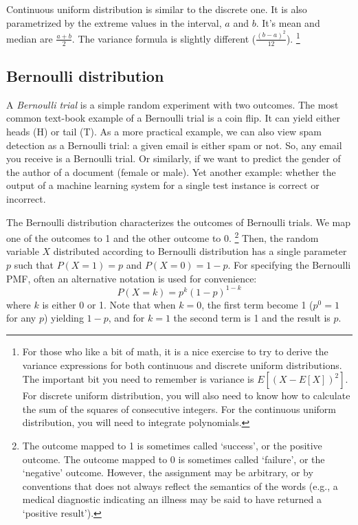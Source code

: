 Continuous uniform distribution is similar to the discrete one.
It is also parametrized by the extreme values in the interval,
$a$ and $b$.
It's mean and median are $\frac{a+b}{2}$.
The variance formula is slightly different ($\frac{(b-a)^{2}}{12}$).%
\footnote{%
  For those who like a bit of math,
  it is a nice exercise to try to derive the variance expressions
  for both continuous and discrete uniform distributions.
  The important bit you need to remember is variance is $E[(X - E[X])^{2}]$.
  For discrete uniform distribution,
  you will also need to know  how to calculate
  the sum of the squares of consecutive integers.
  For the continuous uniform distribution,
  you will need to integrate polynomials.
}

\subsection{Bernoulli distribution}

A \emph{Bernoulli trial} is a simple random experiment with two outcomes.
The most common text-book example of a Bernoulli trial is a coin flip.
It can yield either heads (H) or tail (T).
As a more practical example,
we can also view spam detection as a Bernoulli trial:
a given email is either spam or not.
So, any email you receive is a Bernoulli trial.
Or similarly,
if we want to predict the gender of the author of a document (female or male).
Yet another example:
whether the output of a machine learning system
for a single test instance is correct or incorrect.

The Bernoulli distribution characterizes the outcomes of Bernoulli trials.
We map one of the outcomes to \num{1} and the other outcome to \num{0}.%
\footnote{The outcome mapped to \num{1} is sometimes called
`success', or the positive outcome.
The outcome mapped to \num{0} is sometimes called `failure',
or the `negative' outcome.
However, the assignment may be arbitrary,
or by conventions that does not always reflect the semantics of the words
(e.g., a medical diagnostic indicating an illness may be
said to have returned a `positive result').
}
Then, the random variable $X$ distributed
according to Bernoulli distribution has
a single parameter $p$ such that $P(X=1) = p$ and $P(X=0) = 1 - p$.
For specifying the Bernoulli PMF,
often an alternative notation is used for convenience:
\[
  P(X = k) = p^{k} (1 - p)^{1-k}
\]
where $k$ is either \num{0} or \num{1}.
Note that when $k = 0$, the first term become \num{1}
($p^{0} = 1$ for any $p$) yielding $1 - p$,
and for $k = 1$ the second term is \num{1} and the result is $p$.


